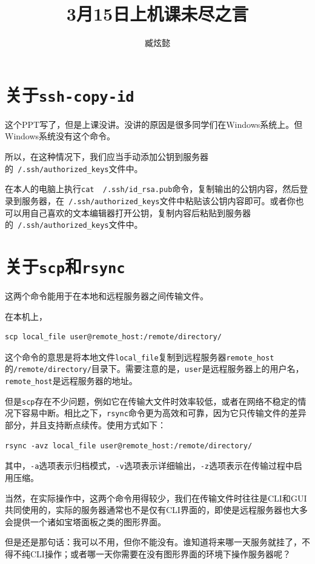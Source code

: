 \documentclass[12pt]{ctexart}
\begin{document}
\title{3月15日\quad 上机课未尽之言}
\author{臧炫懿}
\date{}
\maketitle
\tableofcontents

\section{关于\texttt{ssh-copy-id}}

这个PPT写了，但是上课没讲。没讲的原因是很多同学们在Windows系统上。但Windows系统没有这个命令。

所以，在这种情况下，我们应当手动添加公钥到服务器的\texttt{~/.ssh/authorized\_keys}文件中。

在本人的电脑上执行\texttt{cat ~/.ssh/id_rsa.pub}命令，复制输出的公钥内容，然后登录到服务器，在\texttt{~/.ssh/authorized\_keys}文件中粘贴该公钥内容即可。或者你也可以用自己喜欢的文本编辑器打开公钥，复制内容后粘贴到服务器的\texttt{~/.ssh/authorized\_keys}文件中。

\section{关于\texttt{scp}和\texttt{rsync}}
这两个命令能用于在本地和远程服务器之间传输文件。

在本机上，\begin{verbatim}
scp local_file user@remote_host:/remote/directory/
\end{verbatim}
这个命令的意思是将本地文件\texttt{local\_file}复制到远程服务器\texttt{remote\_host}的\texttt{/remote/directory/}目录下。需要注意的是，\texttt{user}是远程服务器上的用户名，\texttt{remote\_host}是远程服务器的地址。

但是\texttt{scp}存在不少问题，例如它在传输大文件时效率较低，或者在网络不稳定的情况下容易中断。相比之下，\texttt{rsync}命令更为高效和可靠，因为它只传输文件的差异部分，并且支持断点续传。使用方式如下：
\begin{verbatim}
rsync -avz local_file user@remote_host:/remote/directory/
\end{verbatim}
其中，\texttt{-a}选项表示归档模式，\texttt{-v}选项表示详细输出，\texttt{-z}选项表示在传输过程中启用压缩。

当然，在实际操作中，这两个命令用得较少，我们在传输文件时往往是CLI和GUI共同使用的，实际的服务器通常也不是仅有CLI界面的，即使是远程服务器也大多会提供一个诸如宝塔面板之类的图形界面。

但是还是那句话：我可以不用，但你不能没有。谁知道将来哪一天服务就挂了，不得不纯CLI操作；或者哪一天你需要在没有图形界面的环境下操作服务器呢？
\end{document}
